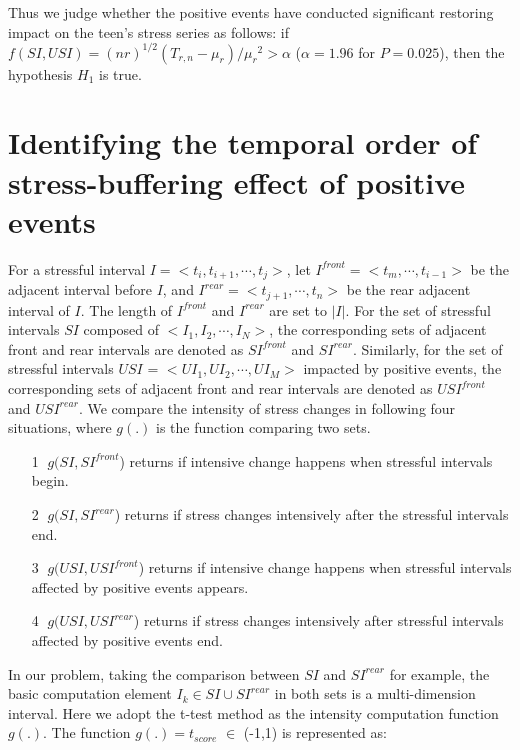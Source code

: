 Thus we judge whether the positive events have conducted significant restoring impact on the teen's stress series as follows:
if $f(SI,USI)=(nr)^{1/2}(T_{r,n}-\mu_{r})/{\mu_r}^2>\alpha$ ($\alpha = 1.96$ for $P=0.025$),
then the hypothesis $H_1$ is true.

\section{Identifying the temporal order of stress-buffering effect of positive events}
\label{mod:mod2}
For a stressful interval $I = <t_i,t_{i+1},\cdots,t_j>$,
let $I^{front} = <t_m,\cdots,t_{i-1}>$ be the adjacent interval before $I$,
and $I^{rear} = <t_{j+1},\cdots,t_n>$ be the rear adjacent interval of $I$.
The length of $I^{front}$ and $I^{rear}$ are set to $|I|$.
For the set of stressful intervals $SI$ composed of $<I_1,I_2,\cdots,I_N>$,
the corresponding sets of adjacent front and rear intervals are denoted as $SI^{front}$ and $SI^{rear}$.
Similarly, for the set of stressful intervals $USI$ = $<UI_1,UI_2,\cdots, UI_M>$ impacted by positive events,
the corresponding sets of adjacent front and rear intervals are denoted as $USI^{front}$ and $USI^{rear}$.
We compare the intensity of stress changes in following four situations,
where $g(.)$ is the function comparing two sets.

\begin{itemize}
\item[\textcircled{1}] $g(SI,SI^{front}$) returns if intensive change happens when stressful intervals begin. 
\item[\textcircled{2}] $g(SI,SI^{rear}$) returns if stress changes intensively after the stressful intervals end.
\item[\textcircled{3}] $g(USI,USI^{front}$) returns if intensive change happens when stressful intervals affected by positive events appears.
\item[\textcircled{4}] $g(USI,USI^{rear}$) returns if stress changes intensively after stressful intervals affected by positive events end. 
\end{itemize}

In our problem, taking the comparison between $SI$ and $SI^{rear}$ for example,
the basic computation element $I_k \in SI \cup SI^{rear}$ in both sets is a multi-dimension interval.
Here we adopt the t-test method as the intensity computation function $g(.)$.
The function $g(.) = t_{score}$ $\in$ (-1,1) is represented as:

